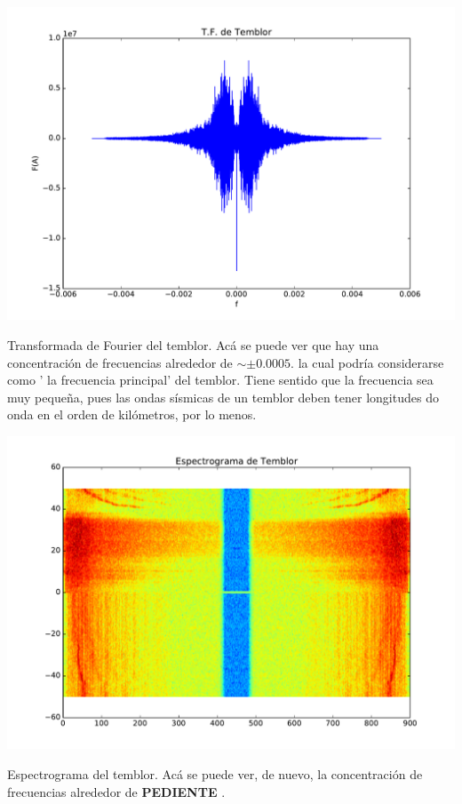 \documentclass[11pt,letterpaper]{exam}
\begin{document}
\begin{center}
\includegraphics[width=14cm]{2_FourierTemblor.pdf}
\end{center}
{Transformada de Fourier del temblor. Acá se puede ver que hay una concentración de frecuencias alrededor de $\sim\pm 0.0005$. la cual podría considerarse como ' la frecuencia principal' del temblor. Tiene sentido que la frecuencia sea muy pequeña, pues las ondas sísmicas de un temblor deben tener longitudes do onda en el orden de kilómetros, por lo menos.}
\begin{center}
\includegraphics[width=14cm]{2_EspectrogramaTemblor.pdf}
\end{center}
Espectrograma del temblor. Acá se puede ver, de nuevo, la concentración de frecuencias alrededor de \textbf{ PEDIENTE }.
\end{document}
